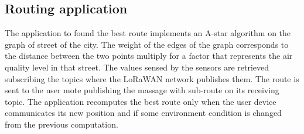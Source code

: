 \subsection*{Routing application}
The application to found the best route implements an A-star algorithm on the graph of street of the city. 
The weight of the edges of the graph corresponds to the distance between the two points multiply for a factor that represents the air quality level in that street. 
The values sensed by the sensors are retrieved subscribing the topics where the LoRaWAN network publishes them. 
The route is sent to the user mote publishing the massage with sub-route on its receiving topic.
The application recomputes the best route only when the user device communicates its new position and if some environment condition is changed from the previous computation.

